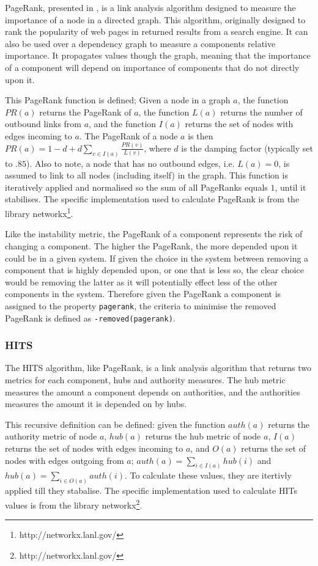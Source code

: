 PageRank, presented in \citep{page1998}, is a link analysis algorithm designed to measure the importance of a node in a directed graph.
This algorithm, originally designed to rank the popularity of web pages in returned results from a search engine.
It can also be used over a dependency graph to measure a components relative importance.
It propagates values though the graph, meaning that the importance of a component will depend on importance of components that do not directly upon it. 

This PageRank function is defined;
Given a node in a graph $a$, the function $PR(a)$ returns the PageRank of $a$, 
the function $L(a)$ returns the number of outbound links from $a$, 
and the function $I(a)$ returns the set of nodes with edges incoming to $a$.
The PageRank of a node $a$ is then $PR(a) = 1-d + d\sum\limits_{v \in I(a)} \frac{PR(v)}{L(v)}$,
where $d$ is the damping factor (typically set to $.85$).
Also to note, a node that has no outbound edges, i.e. $L(a) = 0$, is assumed to link to all nodes (including itself) in the graph.
This function is iteratively applied and normalised so the sum of all PageRanks equals $1$, until it stabilises.
The specific implementation used to calculate PageRank is from the library networkx\footnote{http://networkx.lanl.gov/}.

Like the instability metric, the PageRank of a component represents the risk of changing a component.
The higher the PageRank, the more depended upon it could be in a given system.
If given the choice in the system between removing a component that is highly depended upon, or one that is less so,
the clear choice would be removing the latter as it will potentially effect less of the other components in the system.
Therefore given the PageRank a component is assigned to the property \verb+pagerank+, the criteria to minimise the removed PageRank is defined as \verb!-removed(pagerank)!.


\subsubsection{HITS}
The HITS algorithm, like PageRank, is a link analysis algorithm that returns two metrics for each component, hubs and authority measures.
The hub metric measures the amount a component depends on authorities, and the authorities measures the amount it is depended on by hubs.

This recursive definition can be defined:
given the function $auth(a)$ returns the authority metric of node $a$, $hub(a)$ returns the hub metric of node $a$,
$I(a)$ returns the set of nodes with edges incoming to $a$, and $O(a)$ returns the set of nodes with edges outgoing from $a$;
$auth(a) = \sum \limits_{i \in I(a)} hub(i)$ and  $hub(a) = \sum \limits_{i \in O(a)} auth(i)$.
To calculate these values, they are itertivly applied till they stabalise.
The specific implementation used to calculate HITs values is from the library networkx\footnote{http://networkx.lanl.gov/}.

